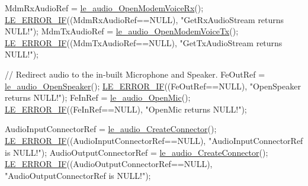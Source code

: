 \begin{DoxyCodeInclude}
{{{{{{{{{    MdmRxAudioRef = \hyperlink{le__audio__interface_8h_ae3ed568ba4d2763ea77e17e77b20ff02}{le\_audio\_OpenModemVoiceRx}();
    \hyperlink{le__log_8h_aceaf11a11691d6c676e36dd317b38dbd}{LE\_ERROR\_IF}((MdmRxAudioRef==NULL), \textcolor{stringliteral}{"GetRxAudioStream returns NULL!"});
    MdmTxAudioRef = \hyperlink{le__audio__interface_8h_ad745f008bb04873c817da7af3daf783d}{le\_audio\_OpenModemVoiceTx}();
    \hyperlink{le__log_8h_aceaf11a11691d6c676e36dd317b38dbd}{LE\_ERROR\_IF}((MdmTxAudioRef==NULL), \textcolor{stringliteral}{"GetTxAudioStream returns NULL!"});

    \textcolor{comment}{// Redirect audio to the in-built Microphone and Speaker.}
    FeOutRef = \hyperlink{le__audio__interface_8h_a5c19afce44021c4abf6193707317f8de}{le\_audio\_OpenSpeaker}();
    \hyperlink{le__log_8h_aceaf11a11691d6c676e36dd317b38dbd}{LE\_ERROR\_IF}((FeOutRef==NULL), \textcolor{stringliteral}{"OpenSpeaker returns NULL!"});
    FeInRef = \hyperlink{le__audio__interface_8h_a74f1ef979329f6c2bd56ea622f4d05b2}{le\_audio\_OpenMic}();
    \hyperlink{le__log_8h_aceaf11a11691d6c676e36dd317b38dbd}{LE\_ERROR\_IF}((FeInRef==NULL), \textcolor{stringliteral}{"OpenMic returns NULL!"});

    AudioInputConnectorRef = \hyperlink{le__audio__interface_8h_a570aaf85086f00aca592acfbaaa237be}{le\_audio\_CreateConnector}();
    \hyperlink{le__log_8h_aceaf11a11691d6c676e36dd317b38dbd}{LE\_ERROR\_IF}((AudioInputConnectorRef==NULL), \textcolor{stringliteral}{"AudioInputConnectorRef is NULL!"});
    AudioOutputConnectorRef = \hyperlink{le__audio__interface_8h_a570aaf85086f00aca592acfbaaa237be}{le\_audio\_CreateConnector}();
    \hyperlink{le__log_8h_aceaf11a11691d6c676e36dd317b38dbd}{LE\_ERROR\_IF}((AudioOutputConnectorRef==NULL), \textcolor{stringliteral}{"AudioOutputConnectorRef is NULL!"});

}}}}}}}}}
\end{DoxyCodeInclude}
